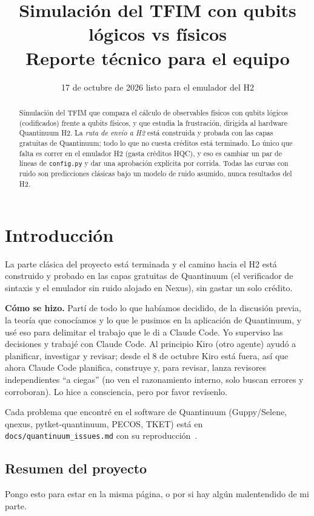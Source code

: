 \documentclass[11pt,a4paper]{article}
\title{\textbf{Simulaci\'on del TFIM con qubits l\'ogicos vs f\'isicos}\\[0.3em]
\large Reporte t\'ecnico para el equipo}
\author{}
\date{17 de octubre de 2026 \quad\textbullet\quad listo para el emulador del H2}
\newcommand{\code}[1]{\nolinkurl{#1}}
\begin{document}
\maketitle

\begin{abstract}
\noindent Simulaci\'on del TFIM que compara el c\'alculo de observables f\'isicos con qubits l\'ogicos
(codificados) frente a qubits f\'isicos, y que estudia la frustraci\'on, dirigida al hardware
Quantinuum H2. La \emph{ruta de env\'io a H2} est\'a construida y probada con las
capas gratuitas de Quantinuum; todo lo que no cuesta cr\'editos est\'a terminado. Lo \'unico que falta
es correr en el emulador H2 (gasta cr\'editos HQC), y eso es cambiar un par de l\'ineas de
\texttt{config.py} y dar una aprobaci\'on expl\'icita por corrida. Todas las curvas con ruido son
predicciones cl\'asicas bajo un modelo de ruido asumido, nunca resultados del H2.
\end{abstract}

\tableofcontents

\section{Introducci\'on}

La parte cl\'asica del proyecto est\'a terminada y el camino hacia el H2 est\'a construido y probado en las
capas gratuitas de Quantinuum (el verificador de sintaxis y el emulador sin ruido alojado en Nexus), sin
gastar un solo cr\'edito.

\textbf{C\'omo se hizo.} Partí de todo lo que habíamos decidido, de la discusión previa, la teoría que conocíamos y lo que le pusimos en la aplicación de Quantinuum, y usé eso para delimitar el trabajo que le di a Claude Code. Yo superviso las decisiones y trabajé con Claude Code. Al principio Kiro
(otro agente) ayud\'o a planificar, investigar y revisar; desde el 8 de octubre Kiro est\'a fuera, as\'i
que ahora Claude Code planifica, construye y, para
revisar, lanza revisores independientes ``a ciegas'' (no ven el razonamiento interno, solo buscan errores y corroboran). Lo hice a consciencia, pero por favor rev\'isenlo.

Cada problema que encontré en el software de Quantinuum (Guppy/Selene, qnexus, pytket-quantinuum, PECOS, TKET) está en \code{docs/quantinuum_issues.md} con su reproducción~\cite{qilog}.

\subsection{Resumen del proyecto}
Pongo esto para estar en la misma página, o por si hay algún malentendido de mi parte.
\end{document}

